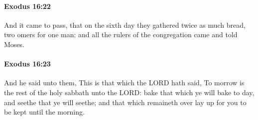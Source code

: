 		\paragraph{Exodus 16:22} %
			\label{EXODUS-16-22}

			And it came to pass, that on the sixth day they gathered twice as much bread, two omers for one man: and all the rulers of the congregation came and told Moses.


		\paragraph{Exodus 16:23} %
			\label{EXODUS-16-23}

			And he said unto them, This is that which the LORD hath said, To morrow is the rest of the holy sabbath unto the LORD: bake that which ye will bake to day, and seethe that ye will seethe; and that which remaineth over lay up for you to be kept until the morning.

